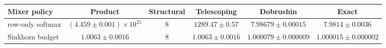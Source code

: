 \begin{center}
\small
\setlength{\tabcolsep}{3.5pt}
\begin{tabular}{lccccc}
\toprule
Mixer policy & Product & Structural & Telescoping & Dobrushin & Exact \\
\midrule
row-only softmax & \((4.459\pm 0.001)\times 10^{21}\) & \(8\) & \(1289.47\pm 0.57\) & \(7.98679\pm 0.00015\) & \(7.9814\pm 0.0036\) \\
Sinkhorn budget & \(1.0063\pm 0.0016\) & \(8\) & \(1.0063\pm 0.0016\) & \(1.000079\pm 0.000009\) & \(1.000015\pm 0.000002\) \\
\bottomrule
\end{tabular}
\label{tab:certificate-comparison}
\end{center}
